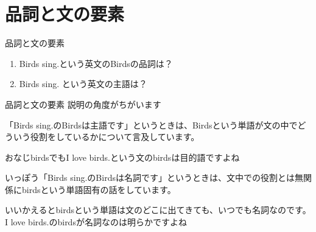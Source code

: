 \documentclass[aspectratio=169, xcolor={dvipsnames,table}]{beamer}
\begin{document}
  \section{品詞と文の要素}
  \begin{frame}[plain]{品詞と文の要素}
    \begin{enumerate}

      \item<1-> Birds sing.という英文のBirdsの品詞は？\hfill{}

      \item<3-> Birds sing. という英文の主語は？\hfill{}
    \end{enumerate}


  \end{frame}
  \begin{frame}[plain]{品詞と文の要素}
    説明の角度がちがいます\pause

    \bigskip

    「Birds sing.のBirdsは主語です」というときは、Birdsという単語が文の中でどういう役割をしているかについて言及しています。\pause

    おなじbirdsでもI love birds.という文のbirdsは目的語ですよね\pause

    \bigskip

    いっぽう「Birds sing.のBirdsは名詞です」というときは、文中での役割とは無関係にbirdsという単語固有の話をしています。\pause

    いいかえるとbirdsという単語は文のどこに出てきても、いつでも名詞なのです。\\ I love birds.のbirdsが名詞なのは明らかですよね
  \end{frame}
\end{document}
